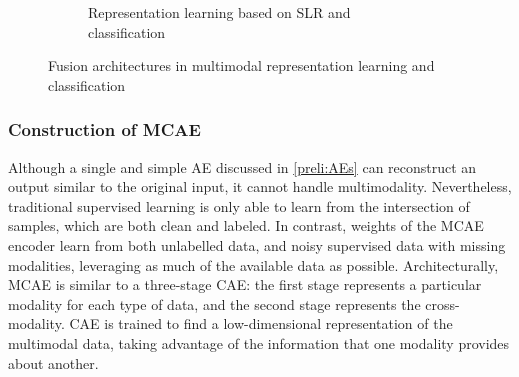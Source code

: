 \begin{figure}
\begin{subfigure}{0.48\linewidth}
		\caption{Representation learning based on SLR and classification}
        \label{fig:slr_11}
	\end{subfigure}
	\caption{Fusion architectures in multimodal representation learning and classification} 
	\label{fig:mm_rL_example1}
\end{figure}

\subsubsection{Construction of MCAE}
Although a single and simple AE discussed in \cref{preli:AEs} can reconstruct an output similar to the original input, it cannot handle multimodality. Nevertheless, traditional supervised learning is only able to learn from the intersection of samples, which are both clean and labeled. In contrast, weights of the MCAE encoder learn from both unlabelled data, and noisy supervised data with missing modalities, leveraging as much of the available data as possible. Architecturally, MCAE is similar to a three-stage CAE: the first stage represents a particular modality for each type of data, and the second stage represents the cross-modality. CAE is trained to find a low-dimensional representation of the multimodal data, taking advantage of the information that one modality provides about another. 

